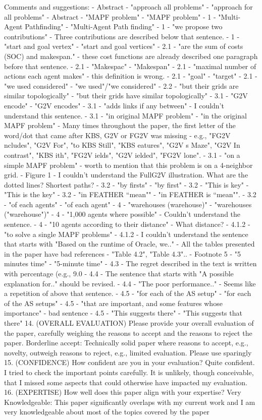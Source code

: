 Comments and suggestions:
- Abstract - "approach all problems" - "approach for all problems"
- Abstract - "MAPF problem" - "MAPF problem"
- 1 - "Multi-Agent Pathfinding" - "Multi-Agent Path finding"
- 1 - "we propose two contributions" - Three contributions are described below that sentence.
- 1 - "start and goal vertex" - "start and goal vertices"
- 2.1 - "are the sum of costs (SOC) and makespan." - these cost functions are already described one paragraph before that sentence.
- 2.1 - "Makespac" - "Makespan"
- 2.1 - "maximal number of actions each agent makes" - this definition is wrong.
- 2.1 - "goal" - "target"
- 2.1 - "we used considered" - "we used"/"we considered"
- 2.2 - "but their grids are similar topologically" - "but their grids have similar topologically"
- 3.1 - "G2V encode" - "G2V encodes"
- 3.1 - "adds links if any between" - I couldn't understand this sentence.
- 3.1 - "in original MAPF problem" - "in the original MAPF problem"
- Many times throughout the paper, the first letter of the word/dot that came after KBS, G2V or FG2V was missing - e.g., "FG2V ncludes", "G2V For", "to KBS Still", "KBS eatures", "G2V s Maze", "G2V In contrast", "KBS ith", "FG2V ields", "G2V ielded", "FG2V lone".
- 3.1 - "on a simple MAPF problem" - worth to mention that this problem is on a 4-neighbor grid.
- Figure 1 - I couldn't understand the FullG2V illustration. What are the dotted lines? Shortest paths?
- 3.2 - "by firsts" - "by first"
- 3.2 - "This is key" - "This is the key"
- 3.2 - "in FEATHER “mean"" - "in FEATHER is “mean"".
- 3.2 - "of each agents" - "of each agent"
- 4 - "warehouses (warehouse)" - "warehouses ("warehouse")"
- 4 - "1,000 agents where possible" - Couldn't understand the sentence.
- 4 - "10 agents according to their distance" - What distance?
- 4.1.2 - "to solve a single MAPF problems"
- 4.1.2 - I couldn't understand the sentence that starts with "Based on the runtime of Oracle, we.."
- All the tables presented in the paper have bad references - "Table 4.2", "Table 4.3"..
- Footnote 5 - "5 minutes time" - "5-minute time"
- 4.3 - The regret described in the text is written with percentage (e.g., 9.0%
- 4.4 - The sentence that starts with "A possible explanation for.." should be revised.
- 4.4 - "The poor performance.." - Seems like a repetition of above that sentence.
- 4.5 - "for each of the AS setup" - "for each of the AS setups"
- 4.5 - "that are important, and some features whose importance" - bad sentence
- 4.5 - "This suggests there" - "This suggests that there"
14. (OVERALL EVALUATION) Please provide your overall evaluation of the paper, carefully weighing the reasons to accept and the reasons to reject the paper.
Borderline accept: Technically solid paper where reasons to accept, e.g., novelty, outweigh reasons to reject, e.g., limited evaluation. Please use sparingly
15. (CONFIDENCE) How confident are you in your evaluation?
Quite confident. I tried to check the important points carefully. It is unlikely, though conceivable, that I missed some aspects that could otherwise have impacted my evaluation.
16. (EXPERTISE) How well does this paper align with your expertise?
Very Knowledgeable: This paper significantly overlaps with my current work and I am very knowledgeable about most of the topics covered by the paper

